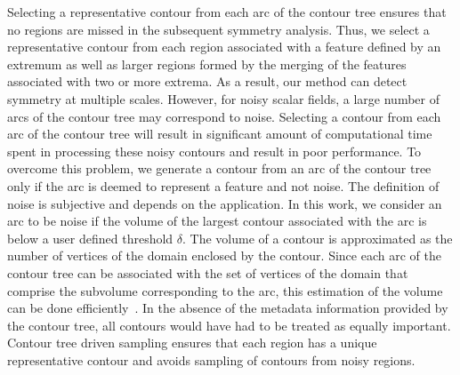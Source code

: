 \documentclass[review,journal]{vgtc}         %
\begin{document}
Selecting a representative contour from each arc of the contour tree ensures that no regions
are missed in the subsequent symmetry analysis. Thus, we select a representative contour
from each region associated with a feature defined by an extremum as well as larger regions formed
by the merging of the features associated with two or more extrema. As a result,
our method can detect symmetry at multiple scales. However, for noisy scalar fields, a large
number of arcs of the contour tree may correspond to noise. Selecting a contour from each
arc of the contour tree will result in significant amount of computational time spent in
processing these noisy contours and result in poor performance. To overcome this problem,
we generate a contour from an arc of the contour tree only if the arc is deemed to represent
a feature and not noise. The definition of noise is subjective and depends on the application.
In this work, we consider an arc to be noise if the volume of the 
largest contour associated with the arc is below a user defined threshold $\delta$. The volume of a
contour is approximated as the number of vertices of the domain enclosed by the contour. 
Since each arc of the contour tree can be associated with the set of vertices of the domain 
that comprise the subvolume corresponding to the arc, this estimation of the volume can be done 
efficiently~\cite{CarrSP10}. In the absence of the metadata information provided by the contour tree,
all contours would have had to be treated as equally important. Contour tree driven sampling ensures
that each region has a unique representative contour and avoids sampling of contours from noisy regions.
\end{document}
